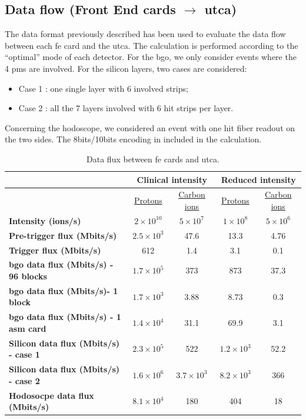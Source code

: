 \subsection{Data flow (Front End cards  $\rightarrow$ \gls{utca})\newline}\label{chapappA::subsec::dataFlow}
The data format previously described has been used to evaluate the data flow between each \gls{fe} card and the \gls{utca}. The calculation is performed according to the \enquote{optimal} mode of each detector. For the \gls{bgo}, we only consider events where the 4 \glspl{pm} are involved. For the silicon layers, two cases are considered:
\begin{itemize}
	\item Case 1 : one single layer with 6 involved strips;
	\item Case 2 : all the 7 layers involved with 6 hit strips per layer.
\end{itemize}
Concerning the hodoscope, we considered an event with one hit fiber readout on the two sides.\newline
The 8bits/10bits encoding in included in the calculation.

\begin{table} [!htbp]
\centering
\caption{Data flux between \gls{fe} cards and \gls{utca}.}
\label{chapappA::tab::dataFlowFEuTCA}
\begin{tabular}{m{3.5cm} c c c c}
\toprule
\rowcolor{myColorMainA!20}
		&\multicolumn{2}{c}{\textbf{Clinical intensity}} &\multicolumn{2}{c}{\textbf{Reduced intensity}} \\
\midrule
		& \underline{Protons}& \underline{Carbon ions} & \underline{Protons}& \underline{Carbon ions} \\
\midrule
\textbf{Intensity (ions/s)}		& $2\times10^{10}$	& $5\times10^{7}$  & $1\times10^{8}$ & $5\times10^{6}$  \\
\textbf{Pre-trigger flux (Mbits/s)}		& 	$2.5\times10^{3}$ & 47.6 &  13.3 & 4.76 \\
\textbf{Trigger flux (Mbits/s)}		& 	612 & 1.4 & 3.1  & 0.1\\
\textbf{\gls{bgo} data flux (Mbits/s) - 96 blocks}		& 	$1.7\times10^{5}$& 373 & 873 &37.3\\
\textbf{\gls{bgo} data flux (Mbits/s)- 1 block}		& 	$1.7\times10^{3}$& 3.88 & 8.73 & 0.3 \\
\textbf{\gls{bgo} data flux (Mbits/s) - 1 \gls{asm} card}		& 	$1.4\times10^{4}$ & 31.1 & 69.9 & 3.1\\
\textbf{Silicon data flux (Mbits/s) - case 1}		& 	$2.3\times10^{5}$ & 522 & $1.2\times10^{3}$ & 52.2 \\
\textbf{Silicon data flux (Mbits/s) - case 2}		& 	$1.6\times10^{6}$ &  $ 3.7\times10^{3}$ &  $8.2\times10^{3}$ & 366 \\
\textbf{Hodosocpe data flux (Mbits/s)}		& 	$8.1\times10^{4}$ & 180 & 404 &18\\
\bottomrule
\end{tabular}
\end{table}



